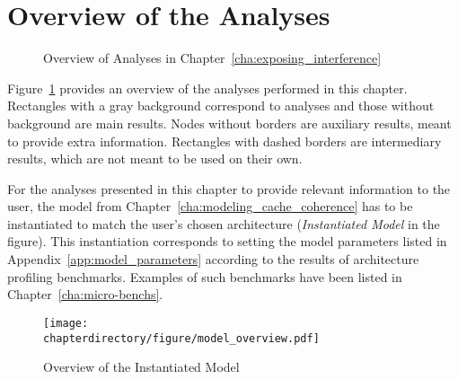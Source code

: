 \section{Overview of the Analyses}
\label{sec:analysis:demo_model}

\begin{figure}[hbt!]

\caption{Overview of Analyses in Chapter~\ref{cha:exposing_interference}}
\label{fig:analysis:summary}
\end{figure}

Figure~\ref{fig:analysis:summary} provides an overview of the analyses performed
in this chapter. Rectangles with a gray background correspond to analyses and
those without background are main results. Nodes without borders are auxiliary
results, meant to provide extra information. Rectangles with dashed borders are
intermediary results, which are not meant to be used on their own.

For the analyses presented in this chapter to provide relevant information to
the user, the model from Chapter~\ref{cha:modeling_cache_coherence} has to be
instantiated to match the user's chosen architecture (\textit{Instantiated
Model} in the figure). This instantiation corresponds to setting the model
parameters listed in Appendix~\ref{app:model_parameters} according to the
results of architecture profiling benchmarks. Examples of such benchmarks have
been listed in Chapter~\ref{cha:micro-benchs}.

\begin{figure}[hbt!]
\begin{center}
\texttt{[image: \\chapterdirectory/figure/model\_overview.pdf]}
\caption{Overview of the Instantiated Model}
\label{fig:analysis:model}
\end{center}
\end{figure}

